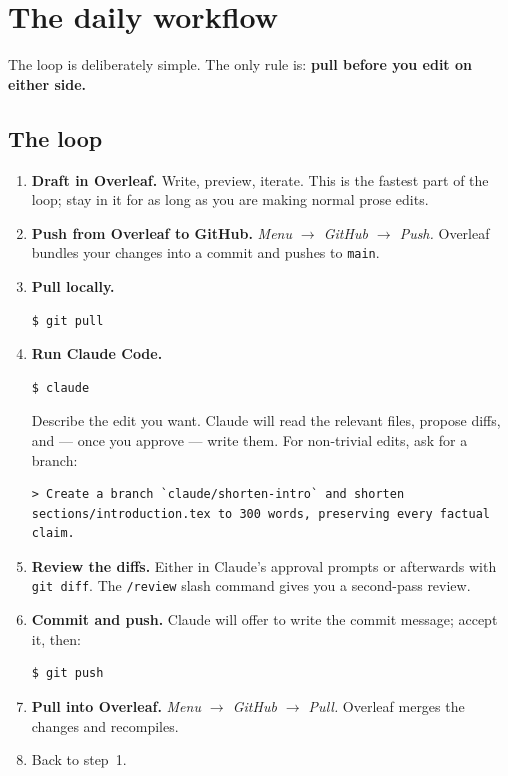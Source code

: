 \section{The daily workflow}
\label{sec:workflow}

The loop is deliberately simple. The only rule is: \textbf{pull before you edit on either side.}

\subsection{The loop}

\begin{enumerate}[leftmargin=*]
  \item \textbf{Draft in Overleaf.} Write, preview, iterate. This is the fastest part of the loop; stay in it for as long as you are making normal prose edits.
  \item \textbf{Push from Overleaf to GitHub.} \textit{Menu $\rightarrow$ GitHub $\rightarrow$ Push.} Overleaf bundles your changes into a commit and pushes to \verb|main|.
  \item \textbf{Pull locally.}
\begin{lstlisting}[style=shell]
$ git pull
\end{lstlisting}
  \item \textbf{Run Claude Code.}
\begin{lstlisting}[style=shell]
$ claude
\end{lstlisting}
  Describe the edit you want. Claude will read the relevant files, propose diffs, and --- once you approve --- write them. For non-trivial edits, ask for a branch:
\begin{lstlisting}[style=prompt]
> Create a branch `claude/shorten-intro` and shorten sections/introduction.tex to 300 words, preserving every factual claim.
\end{lstlisting}
  \item \textbf{Review the diffs.} Either in Claude's approval prompts or afterwards with \verb|git diff|. The \verb|/review| slash command gives you a second-pass review.
  \item \textbf{Commit and push.} Claude will offer to write the commit message; accept it, then:
\begin{lstlisting}[style=shell]
$ git push
\end{lstlisting}
  \item \textbf{Pull into Overleaf.} \textit{Menu $\rightarrow$ GitHub $\rightarrow$ Pull.} Overleaf merges the changes and recompiles.
  \item Back to step~1.
\end{enumerate}

